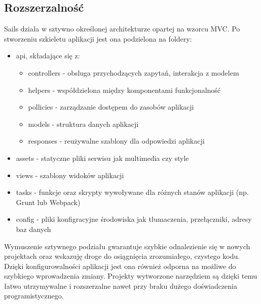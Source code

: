 \documentclass[12pt]{report}
\begin{document}
    \subsection{Rozszerzalność}
      Sails działa w sztywno określonej architekturze opartej na wzorcu MVC.
      Po stworzeniu szkieletu aplikacji jest ona podzielona na foldery:
      \begin{itemize}
        \item api, składające się z:
        \begin{itemize}
          \item controllers - obsluga przychodzących zapytań, interakcja z modelem
          \item helpers - współdzielona między komponentami funkcjonalność
          \item pollicies - zarządzanie dostępem do zasobów aplikacji
          \item models - struktura danych aplikacji
          \item responses - reużywalne szablony dla odpowiedzi aplikacji
        \end{itemize}
        \item assets - statyczne pliki serwisu jak multimedia czy style
        \item views - szablony widoków aplikacji
        \item tasks - funkcje oraz skrypty wywoływane dla różnych stanów aplikacji (np. Grunt lub Webpack)
        \item config - pliki konfigracyjne środowiska jak tłumaczenia, przełączniki, adresy baz danych
      \end{itemize}
      Wymuszenie sztywnego podziału gwarantuje szybkie odnalezienie się w nowych projektach oraz wskazuję droge do osiągnięcia zrozumiałego, czystego kodu.
      Dzięki konfigurowalności aplikacji jest ona również odporna na możliwe do szybkiego wprowadzenia zmiany.
      Projekty wytworzone narzędziem są dzięki temu łatwo utrzymywalne i rozszerzalne nawet przy braku dużego doświadczenia programistycznego. 
\end{document}

